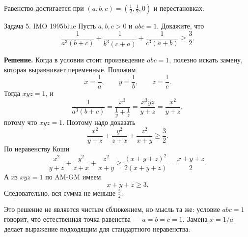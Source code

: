Равенство достигается при $(a,b,c)=(\frac12,\frac12,0)$ и перестановках.


{}
\begin{taskbox}{Задача 5. IMO 1995}{blue}{}
Пусть $a,b,c>0$ и $abc=1$. Докажите, что
\[
    \frac{1}{a^3(b+c)}+
    \frac{1}{b^3(c+a)}+
    \frac{1}{c^3(a+b)}\ge\frac32.
\]
\end{taskbox}

\textbf{Решение.}
Когда в условии стоит произведение $abc=1$, полезно искать замену, которая выравнивает переменные. Положим
\[
    x=\frac1a,
    \qquad y=\frac1b,
    \qquad z=\frac1c.
\]
Тогда $xyz=1$, и
\[
    \frac{1}{a^3(b+c)}=\frac{x^3}{\frac1y+\frac1z}
    =\frac{x^3yz}{y+z}
    =\frac{x^2}{y+z},
\]
потому что $xyz=1$. Поэтому надо доказать
\[
    \frac{x^2}{y+z}+\frac{y^2}{z+x}+\frac{z^2}{x+y}\ge\frac32.
\]
По неравенству Коши
\[
    \frac{x^2}{y+z}+\frac{y^2}{z+x}+\frac{z^2}{x+y}
    \ge
    \frac{(x+y+z)^2}{2(x+y+z)}
    =\frac{x+y+z}{2}.
\]
А из $xyz=1$ по AM-GM имеем
\[
    x+y+z\ge3.
\]
Следовательно, вся сумма не меньше $\frac32$.

\begin{remarkbox}
Это решение не является чистым сближением, но мысль та же: условие $abc=1$ говорит, что естественная точка равенства --- $a=b=c=1$. Замена $x=1/a$ делает выражение подходящим для стандартного неравенства.
\end{remarkbox}